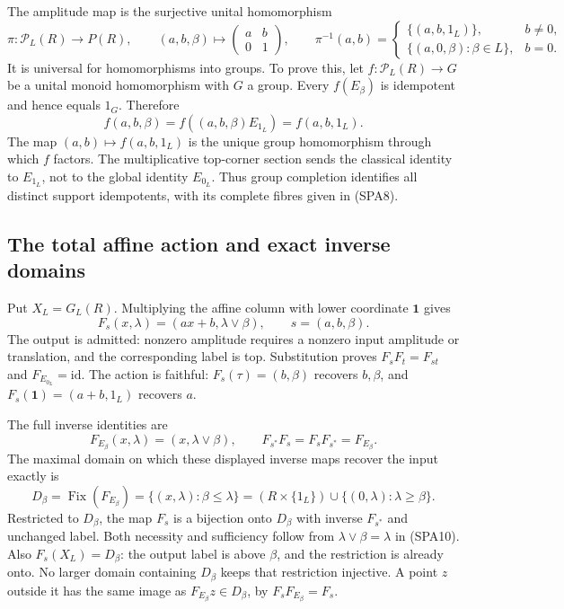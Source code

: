 The amplitude map is the surjective unital homomorphism
\begin{equation}\tag{SPA8}
\pi:\mathcal P_L(R)\to P(R),\qquad
(a,b,\beta)\mapsto\begin{pmatrix}a&b\\0&1\end{pmatrix},\qquad
\pi^{-1}(a,b)=
\begin{cases}
\{(a,b,1_L)\},&b\ne0,\\
\{(a,0,\beta):\beta\in L\},&b=0.
\end{cases}
\end{equation}
It is universal for homomorphisms into groups. To prove this,
let $f:\mathcal P_L(R)\to G$ be a unital monoid homomorphism
with $G$ a group. Every $f(E_\beta)$ is idempotent and hence
equals $1_G$. Therefore
\[
f(a,b,\beta)=f((a,b,\beta)E_{1_L})=f(a,b,1_L).
\]
The map $(a,b)\mapsto f(a,b,1_L)$ is the unique group
homomorphism through which $f$ factors. The multiplicative
top-corner section sends the classical identity to $E_{1_L}$,
not to the global identity $E_{0_L}$.
Thus group completion identifies all distinct support
idempotents, with its complete fibres given in (SPA8).

\subsection{The total affine action and exact inverse domains}

Put $X_L=G_L(R)$. Multiplying the affine column with lower
coordinate $\mathbf1$ gives
\begin{equation}\tag{SPA9}
F_s(x,\lambda)=(ax+b,\lambda\vee\beta),
\qquad s=(a,b,\beta).
\end{equation}
The output is admitted: nonzero amplitude requires a nonzero
input amplitude or translation, and the corresponding label
is top. Substitution proves $F_sF_t=F_{st}$ and
$F_{E_{0_L}}=\mathrm{id}$.
The action is faithful: $F_s(\tau)=(b,\beta)$ recovers
$b,\beta$, and $F_s(\mathbf1)=(a+b,1_L)$ recovers $a$.

The full inverse identities are
\begin{equation}\tag{SPA10}
F_{E_\beta}(x,\lambda)=(x,\lambda\vee\beta),\qquad
F_{s^*}F_s=F_sF_{s^*}=F_{E_\beta}.
\end{equation}
The maximal domain on which these displayed inverse maps
recover the input exactly is
\begin{equation}\tag{SPA11}
D_\beta=\operatorname{Fix}(F_{E_\beta})
=\{(x,\lambda):\beta\le\lambda\}
=(R\times\{1_L\})\cup\{(0,\lambda):\lambda\ge\beta\}.
\end{equation}
Restricted to $D_\beta$, the map $F_s$ is a bijection onto
$D_\beta$ with inverse $F_{s^*}$ and unchanged label.
Both necessity and sufficiency follow from
$\lambda\vee\beta=\lambda$ in (SPA10).
Also $F_s(X_L)=D_\beta$: the output label is above $\beta$,
and the restriction is already onto.
No larger domain containing $D_\beta$ keeps that restriction
injective. A point $z$ outside it has the same image as
$F_{E_\beta}z\in D_\beta$, by $F_sF_{E_\beta}=F_s$.

